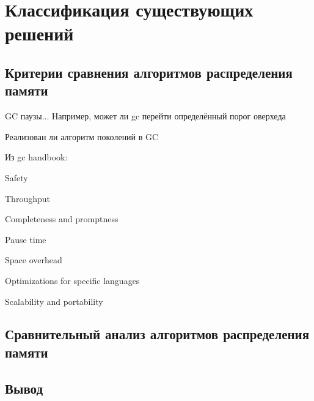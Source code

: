 \chapter{Классификация существующих решений}

\section{Критерии сравнения алгоритмов распределения памяти}
GC паузы... Например, может ли gc перейти определённый порог оверхеда

Реализован ли алгоритм поколений в GC



Из gc handbook:

Safety

Throughput

Completeness and promptness

Pause time

Space overhead

Optimizations for specific languages

Scalability and portability



\section{Сравнительный анализ алгоритмов распределения памяти}



\section{Вывод}
